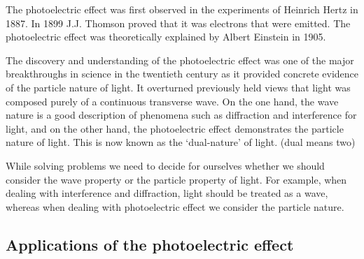 \begin{IFact}
{The photoelectric effect was first observed in the experiments of Heinrich Hertz in 1887. In 1899 J.J. Thomson proved that it was electrons that were emitted. The photoelectric effect was theoretically explained by Albert Einstein in 1905.}
\end{IFact}

 
The discovery and understanding of the photoelectric effect was one of the major breakthroughs in science in the twentieth century as it provided concrete evidence of the particle nature of light. It overturned previously held views that light was composed purely of a continuous transverse wave. On the one hand, the wave nature is a good description of phenomena such as diffraction and interference for light, and on the other hand, the photoelectric effect demonstrates the particle nature of light. This is now known as the `dual-nature' of light. (dual means two)

 
While solving problems we need to decide for ourselves whether we should consider the wave property or the particle property of light. For example, when dealing with interference and diffraction, light should be treated as a wave, whereas when dealing with photoelectric effect we consider the particle nature.
 
\subsection{Applications of the photoelectric effect}

